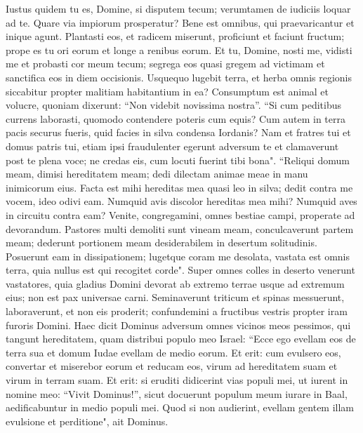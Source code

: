 \begin{biblechapter}  
\verse Iustus quidem tu es, Domine, si disputem tecum; verumtamen de iudiciis loquar ad te. Quare via impiorum prosperatur? Bene est omnibus, qui praevaricantur et inique agunt. 
\verse Plantasti eos, et radicem miserunt, proficiunt et faciunt fructum; prope es tu ori eorum et longe a renibus eorum. 
\verse Et tu, Domine, nosti me, vidisti me et probasti cor meum tecum; segrega eos quasi gregem ad victimam et sanctifica eos in diem occisionis. 
\verse Usquequo lugebit terra, et herba omnis regionis siccabitur propter malitiam habitantium in ea? Consumptum est animal et volucre, quoniam dixerunt: “Non videbit novissima nostra”. 
\verse “Si cum peditibus currens laborasti, quomodo contendere poteris cum equis? Cum autem in terra pacis securus fueris, quid facies in silva condensa Iordanis? 
\verse Nam et fratres tui et domus patris tui, etiam ipsi fraudulenter egerunt adversum te et clamaverunt post te plena voce; ne credas eis, cum locuti fuerint tibi bona". 
\verse “Reliqui domum meam, dimisi hereditatem meam; dedi dilectam animae meae in manu inimicorum eius. 
\verse Facta est mihi hereditas mea quasi leo in silva; dedit contra me vocem, ideo odivi eam. 
\verse Numquid avis discolor hereditas mea mihi? Numquid aves in circuitu contra eam? Venite, congregamini, omnes bestiae campi, properate ad devorandum. 
\verse Pastores multi demoliti sunt vineam meam, conculcaverunt partem meam; dederunt portionem meam desiderabilem in desertum solitudinis. 
\verse Posuerunt eam in dissipationem; lugetque coram me desolata, vastata est omnis terra, quia nullus est qui recogitet corde". 
\verse Super omnes colles in deserto venerunt vastatores, quia gladius Domini devorat ab extremo terrae usque ad extremum eius; non est pax universae carni. 
\verse Seminaverunt triticum et spinas messuerunt, laboraverunt, et non eis proderit; confundemini a fructibus vestris propter iram furoris Domini. 
\verse Haec dicit Dominus adversum omnes vicinos meos pessimos, qui tangunt hereditatem, quam distribui populo meo Israel: “Ecce ego evellam eos de terra sua et domum Iudae evellam de medio eorum. 
\verse Et erit: cum evulsero eos, convertar et miserebor eorum et reducam eos, virum ad hereditatem suam et virum in terram suam. 
\verse Et erit: si eruditi didicerint vias populi mei, ut iurent in nomine meo: “Vivit Dominus!”, sicut docuerunt populum meum iurare in Baal, aedificabuntur in medio populi mei. 
\verse Quod si non audierint, evellam gentem illam evulsione et perditione", ait Dominus. 
\end{biblechapter}

